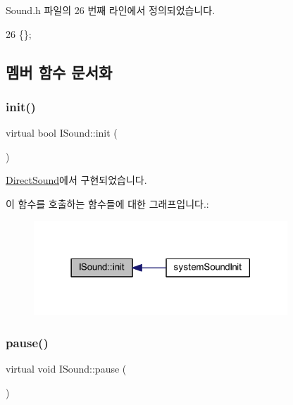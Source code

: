 Sound.\+h 파일의 26 번째 라인에서 정의되었습니다.


\begin{DoxyCode}
26 \{\};
\end{DoxyCode}


\subsection{멤버 함수 문서화}
\mbox{\label{class_i_sound_ac14f05f2d5050cfefa4133099d9f656e}} 
\subsubsection{\texorpdfstring{init()}{init()}}
{\footnotesize\ttfamily virtual bool I\+Sound\+::init (\begin{DoxyParamCaption}{ }\end{DoxyParamCaption})\hspace{0.3cm}{\ttfamily [pure virtual]}}



\mbox{\hyperlink{class_direct_sound_a006583b3b3c1b16ca4c54bf9a6141fb9}{Direct\+Sound}}에서 구현되었습니다.

이 함수를 호출하는 함수들에 대한 그래프입니다.\+:
\nopagebreak
\begin{figure}[H]
\begin{center}
\leavevmode
\includegraphics[width=270pt]{class_i_sound_ac14f05f2d5050cfefa4133099d9f656e_icgraph}
\end{center}
\end{figure}
\mbox{\label{class_i_sound_a9fb848e0e31ab8bcd5384b0422855c3d}} 
\subsubsection{\texorpdfstring{pause()}{pause()}}
{\footnotesize\ttfamily virtual void I\+Sound\+::pause (\begin{DoxyParamCaption}{ }\end{DoxyParamCaption})\hspace{0.3cm}{\ttfamily [pure virtual]}}



